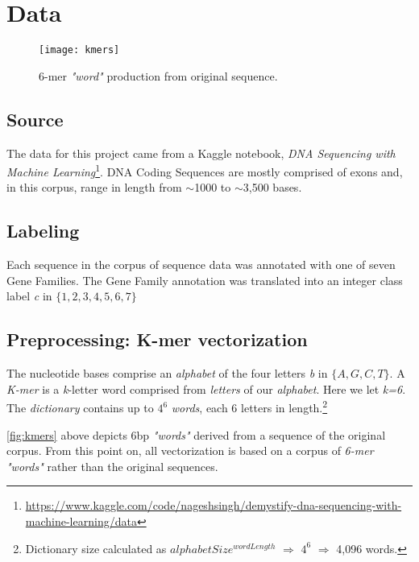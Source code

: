 \section{Data}
%
  \begin{figure}
    \centering
    \texttt{[image: kmers]}
    \caption{%
      6-mer \textit{"word"} production from original sequence.
    }
    \label{fig:kmers}
  \end{figure}
%
\subsection{Source}

The data for this project came from a Kaggle notebook, \textit{DNA Sequencing with Machine Learning}\footnote{\url{https://www.kaggle.com/code/nageshsingh/demystify-dna-sequencing-with-machine-learning/data}}.
%
DNA Coding Sequences are mostly comprised of exons and, in this corpus, range in length from  $\sim$1000 to $\sim$3,500 bases.

\subsection{Labeling}
Each sequence in the corpus of sequence data was annotated with one of seven Gene Families.  The Gene Family annotation was translated into an integer class label \textit{c} in $\{1, 2, 3, 4, 5, 6, 7\}$


\subsection{Preprocessing: K-mer vectorization}
%
The nucleotide bases comprise an \textit{alphabet} of the four letters \textit{b} in $\{A, G, C, T\}$.  A \textit{K-mer} is a \textit{k}-letter word comprised from \textit{letters} of our \textit{alphabet}.  Here we let \textit{k=6}.  The \textit{dictionary} contains up to $4^{6}$ \textit{words}, each 6 letters in length.\footnote{Dictionary size calculated as $alphabetSize^{wordLength}$ $\Rightarrow$ $4^{6}$ $\Rightarrow$ 4,096 words.}

\autoref{fig:kmers} above depicts 6bp \textit{"words"} derived from a sequence of the original corpus.  From this point on, all vectorization is based on a corpus of \textit{6-mer "words"} rather than the original sequences.
%
